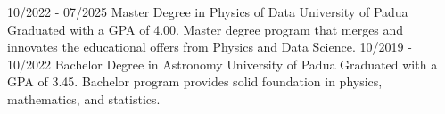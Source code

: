 \documentclass[9pt]{developercv} %
\begin{document}
\vspace{-10 pt}
\begin{entrylist}
    \entry
		{10/2022 - 07/2025}
		{Master Degree in Physics of Data }
		{University of Padua}
		{Graduated with a GPA of 4.00. Master degree program that merges and innovates the educational offers from Physics and Data Science.}
    \entry
		{10/2019 - 10/2022}
		{Bachelor Degree in Astronomy}
		{University of Padua}
		{Graduated with a GPA of 3.45. Bachelor program provides solid foundation in physics, mathematics, and statistics.}

\end{entrylist}

\end{document}
